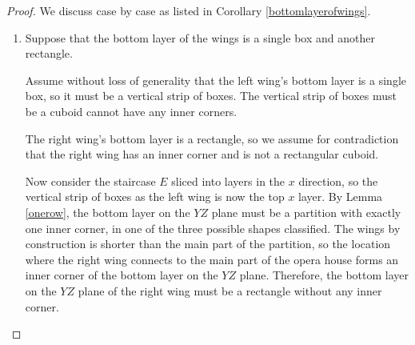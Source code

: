 \documentclass{amsart}[10pt]
\theoremstyle{plain}
\theoremstyle{definition}
\begin{document}
\begin{proof}
We discuss case by case as listed in Corollary \ref{bottomlayerofwings}.

\begin{enumerate}
\item Suppose that the bottom layer of the wings is a single box and another rectangle.

Assume without loss of generality that the left wing's bottom layer is a single box, so it must be a vertical strip of boxes. The vertical strip of boxes must be a cuboid cannot have any inner corners. 

The right wing's bottom layer is a rectangle, so we assume for contradiction that the right wing has an inner corner and is not a rectangular cuboid. 






Now consider the staircase $E$ sliced into layers in the $x$ direction, so the vertical strip of boxes as the left wing is now the top $x$ layer.  By Lemma \ref{onerow}, the bottom layer on the $YZ$ plane must be a partition with exactly one inner corner, in one of the three possible shapes classified. The wings by construction is shorter than the main part of the partition, so the location where the right wing connects to the main part of the opera house forms an inner corner of the bottom layer on the $YZ$ plane. Therefore, the bottom layer on the $YZ$ plane of the right wing must be a rectangle without any inner corner. 


\end{enumerate}
\end{proof}
\end{document}

